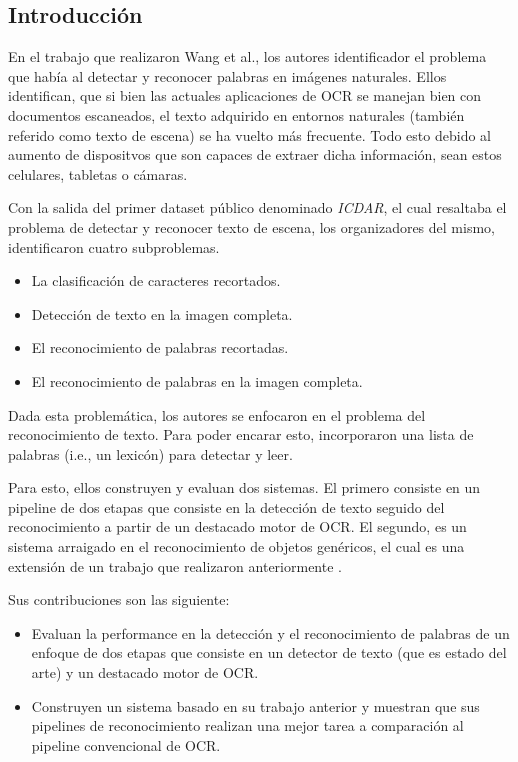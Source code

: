 \subsection{Introducción}

	En el trabajo que realizaron Wang et al., los autores identificador el problema que había al detectar y reconocer palabras en imágenes naturales. Ellos identifican, que si bien las actuales aplicaciones de OCR se manejan bien con documentos escaneados, el texto adquirido en entornos naturales (también referido como texto de escena) se ha vuelto más frecuente. Todo esto debido al aumento de dispositvos que son capaces de extraer dicha información, sean estos celulares, tabletas o cámaras.
	
	Con la salida del primer dataset público denominado \textit{ICDAR}, el cual resaltaba el problema de detectar y reconocer texto de escena, los organizadores del mismo, identificaron cuatro subproblemas.
	\begin{itemize}
		\item La clasificación de caracteres recortados.
		\item Detección de texto en la imagen completa.
		\item El reconocimiento de palabras recortadas.
		\item El reconocimiento de palabras en la imagen completa.
	\end{itemize}
	
	Dada esta problemática, los autores se enfocaron en el problema del reconocimiento de texto. Para poder encarar esto, incorporaron una lista de palabras (i.e., un lexicón) para detectar y leer.
		
	Para esto, ellos construyen y evaluan dos sistemas. El primero consiste en un pipeline de dos etapas que consiste en la detección de texto seguido del reconocimiento a partir de un destacado motor de OCR. El segundo, es un sistema arraigado en el reconocimiento de objetos genéricos, el cual es una extensión de un trabajo que realizaron anteriormente \cite{WB10}.
	
	Sus contribuciones son las siguiente:
		\begin{itemize}
			\item Evaluan la performance en la detección y el reconocimiento de palabras de un enfoque de dos etapas que consiste en un detector de texto (que es estado del arte) y un destacado motor de OCR.
			\item Construyen un sistema basado en su trabajo anterior \cite{WB10} y muestran que sus pipelines de reconocimiento realizan una mejor tarea a comparación al pipeline convencional de OCR.
		\end{itemize}